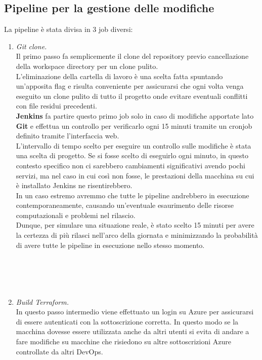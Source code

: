 \documentclass[a4paper,12pt]{report}
\begin{document}
\subsection{Pipeline per la gestione delle modifiche}
La pipeline è stata divisa in 3 job diversi:\\
\begin{enumerate}
\item \textit{Git clone.} \\
Il primo passo fa semplicemente il clone del repository previo cancellazione della workspace directory per un clone pulito.\\
L'eliminazione della cartella di lavoro è una scelta fatta spuntando un'apposita flag e risulta conveniente per assicurarsi che ogni volta venga eseguito un clone pulito di tutto il progetto onde evitare eventuali conflitti con file residui precedenti.\\
\textbf{Jenkins} fa partire questo primo job solo in caso di modifiche apportate lato \textbf{Git} e effettua un controllo per verificarlo ogni 15 minuti tramite un cronjob definito tramite l'interfaccia web. \\
L'intervallo di tempo scelto per eseguire un controllo sulle modifiche è stata una scelta di progetto. Se si fosse scelto di eseguirlo ogni minuto, in questo contesto specifico non ci sarebbero cambiamenti significativi avendo pochi servizi, ma nel caso in cui così non fosse, le prestazioni della macchina su cui è installato Jenkins ne risentirebbero. \\In un caso estremo avremmo che tutte le pipeline andrebbero in esecuzione contemporaneamente, causando un'eventuale esaurimento delle risorse computazionali e problemi nel rilascio. \\
Dunque, per simulare una situazione reale, è stato scelto 15 minuti per avere la certezza di più rilasci nell'arco della giornata e minimizzando la probabilità di avere tutte le pipeline in esecuzione nello stesso momento.\\ \\ \\ \\ \\
\item \textit{Build Terraform.} \\
In questo passo intermedio viene effettuato un login su Azure per assicurarsi di essere autenticati con la sottoscrizione corretta. In questo modo se la macchina dovesse essere utilizzata anche da altri utenti si evita di andare a fare modifiche su macchine che risiedono su altre sottoscrizioni Azure controllate da altri DevOps.\\

\end{enumerate}
\end{document}
